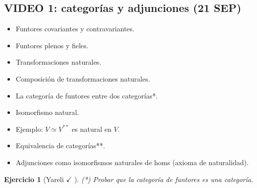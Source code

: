 \documentclass[12pt,letterpaper,titlepage]{article}
\newtheorem{exe}{Ejercicio}
\theoremstyle{definition}
\newcommand\<{\langle}
\renewcommand\>{\rangle}
\begin{document}
\subsection{VIDEO 1: categorías y adjunciones (21 SEP)}
\begin{itemize}
  \item Funtores covariantes y contravariantes.
  \item Funtores plenos y fieles.
  \item Transformaciones naturales.
  \item Composición de transformaciones naturales.
  \item La categoría de funtores entre dos categorías*.
  \item Isomorfismo natural.
  \item Ejemplo: $V\simeq V^{**}$ es natural en $V$.
  \item Equivalencia de categorías**.
  \item Adjunciones como isomorfismos naturales de homs
    (axioma de naturalidad).
\end{itemize}
\begin{exe}[Yareli $\checkmark$ ]
    (*) Probar que la categoría de funtores es una categoría.
\end{exe}
\end{document}
